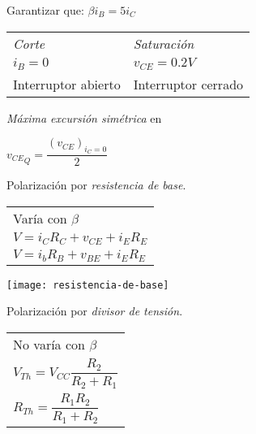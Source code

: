 \documentclass[11pt,a4paper]{article}
\begin{document}
\begin{multicols}{2}
\begin{cajita}
			\begin{flushleft}
				Garantizar que: $\beta i_B = 5 i_C$
			\end{flushleft} \vspace{-.2cm}
		
			\begin{tabular}{l l}
				\textsl{Corte} 		& \textsl{Saturación} 				\\[.1cm]
				$i_B = 0$ 			& $v_{CE} = 0.2 V$ 					\\[.1cm]
				Interruptor abierto & Interruptor cerrado
				
			\end{tabular}
		
			\vspace{.2cm}
			
			\vspace{-.7cm}
			
			\begin{flushleft}
				\textsl{Máxima excursión simétrica} en
			\end{flushleft}
			
			${v_{CE}}_Q = \dfrac{(v_{CE})_{i_C = 0}}{2}$
			
			\begin{multicols}{2}
				
				\begin{flushleft}
					Polarización por \textsl{resistencia de base}.
				\end{flushleft}
			
				\begin{tabular}{l}
					Varía con $\beta$ \vspace{.1cm}\\
					$V = i_C R_C + v_{CE} +  i_E R_E $ \vspace{.1cm}\\
					$V = i_b R_B + v_{BE} + i_E R_E$
				\end{tabular} 
				
				
				\vspace{1cm}
				
				\texttt{[image: resistencia-de-base]}
				
				\columnbreak
				
				\begin{flushleft}
					Polarización por \textsl{divisor de tensión}.
				\end{flushleft}
				
				\begin{tabular}{l}
					No varía con $\beta$ \vspace{.1cm}\\
					$V_{Th} = V_{CC} \dfrac{R_2}{R_2 + R_1}$ \vspace{.1cm} \\
					$R_{Th} = \dfrac{R_1 R_2}{R_1 + R_2}$  \\
				\end{tabular} 
			

\end{multicols}
\end{cajita}
\end{multicols}
\end{document}
